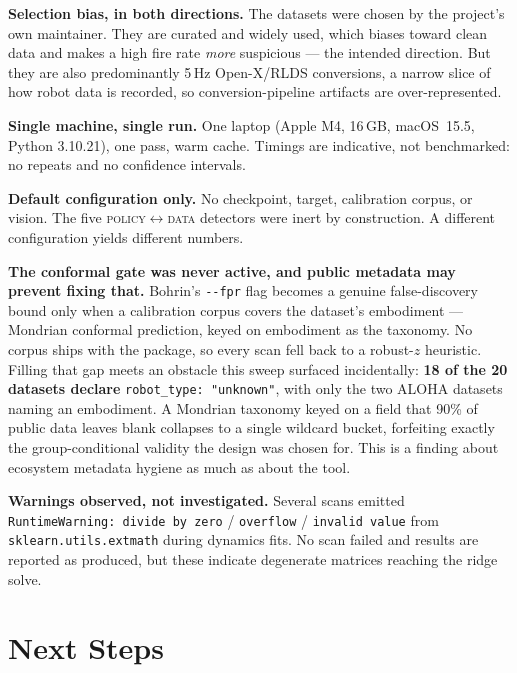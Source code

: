 \documentclass[10pt,a4paper]{article}
\begin{document}
\textbf{Selection bias, in both directions.} The datasets were chosen by the project's own
maintainer. They are curated and widely used, which biases toward clean data and makes a
high fire rate \emph{more} suspicious --- the intended direction. But they are also
predominantly 5\,Hz Open-X/RLDS conversions, a narrow slice of how robot data is recorded,
so conversion-pipeline artifacts are over-represented.

\textbf{Single machine, single run.} One laptop (Apple M4, 16\,GB, macOS~15.5, Python
3.10.21), one pass, warm cache. Timings are indicative, not benchmarked: no repeats and no
confidence intervals.

\textbf{Default configuration only.} No checkpoint, target, calibration corpus, or vision.
The five \textsc{policy}$\leftrightarrow$\textsc{data} detectors were inert by
construction. A different configuration yields different numbers.

\textbf{The conformal gate was never active, and public metadata may prevent fixing that.}
Bohrin's \texttt{-{}-fpr} flag becomes a genuine false-discovery bound only when a
calibration corpus covers the dataset's embodiment --- Mondrian conformal prediction,
keyed on embodiment as the taxonomy. No corpus ships with the package, so every scan fell
back to a robust-$z$ heuristic. Filling that gap meets an obstacle this sweep surfaced
incidentally: \textbf{18 of the 20 datasets declare} \mbox{\texttt{robot\_type:\,"unknown"}}, with
only the two ALOHA datasets naming an embodiment. A Mondrian taxonomy keyed on a field
that 90\% of public data leaves blank collapses to a single wildcard bucket, forfeiting
exactly the group-conditional validity the design was chosen for. This is a finding about
ecosystem metadata hygiene as much as about the tool.

\textbf{Warnings observed, not investigated.} Several scans emitted
\mbox{\texttt{RuntimeWarning:\,divide by zero}} / \mbox{\texttt{overflow}} / \mbox{\texttt{invalid value}} from
\texttt{sklearn.utils.extmath} during dynamics fits. No scan failed and results are
reported as produced, but these indicate degenerate matrices reaching the ridge solve.

\section{Next Steps}
\end{document}
